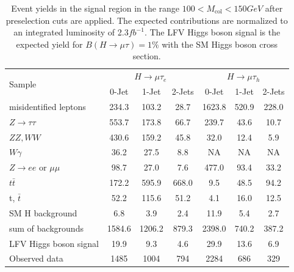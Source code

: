 \documentclass[oneside, letterpaper, oldfontcommands]{memoir}
\begin{document}
 \begin{table}[hbtp]
 \centering  \caption{Event yields in the signal region in the range $100 < M_\text{col} < 150GeV$ after preselection cuts are applied. The expected contributions are normalized to an integrated luminosity
of 2.3$fb^{-1}$. The LFV Higgs boson signal is the expected yield for $B(H \rightarrow \mu \tau)=1\%$ with the SM Higgs boson cross section.}
  \label{tab:EventYieldTable_100_to_150_13TeV_Presel}
  \begin{tabular}{lccc|ccc} \hline
        \multirow{2}{*}{Sample}                                & \multicolumn{3}{c}{$H \rightarrow \mu \tau_{e}$}                &     \multicolumn{3}{c}{$H \rightarrow \mu \tau_{h}$}     \\ \cline{2-7}
                                              &  0-Jet            & 1-Jet            & 2-Jets               &  0-Jet             & 1-Jet            & 2-Jets  \\ \hline
    misidentified leptons                    &  234.3  &   103.2     &  28.7 & 1623.8 & 520.9 & 228.0\\
    $ Z \rightarrow \tau \tau$                    & 553.7   & 173.8      &  66.7 & 239.7   & 43.6  & 10.7  \\
    $ ZZ,WW$                       & 430.6   &  159.2      &  45.8 & 32.0   & 12.4  & 5.9\\
    $ W\gamma$                             &   36.2  &  27.5      &  8.8 &NA & NA & NA    \\
    $ Z \rightarrow ee$ or $\mu \mu$          &  98.7   &  27.0      &  7.6 & 477.0 & 93.4& 33.2  \\
    $t\bar{t}     $                            &  172.2   & 595.9      & 668.0 &9.5 & 48.5 & 94.2    \\
    t, $\bar{t}$                             &  52.2   &  115.6      &  51.2 &4.1 & 16.0 & 12.5    \\
    SM H background                        &  6.8   &  3.9      &  2.4 &11.9 & 5.4 & 2.7    \\ \hline
    sum of backgrounds                       & 1584.6   & 1206.2      & 879.3 &2398.0& 740.2 & 387.2  \\  \hline
    LFV Higgs boson signal                   &  19.9   &  9.3      &  4.6 &29.9 & 13.6 & 6.9    \\ \hline \hline
      Observed data                          &  1485    &  1004       &  794  & 2284 & 686 & 329 \\ \hline
  \end{tabular}
\end{table}
\end{document}
